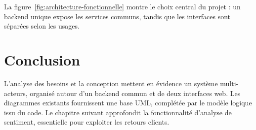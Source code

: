 La figure~\ref{fig:architecture-fonctionnelle} montre le choix central du projet : un backend unique expose les services communs, tandis que les interfaces sont séparées selon les usages.

\section*{Conclusion}
L'analyse des besoins et la conception mettent en évidence un système multi-acteurs, organisé autour d'un backend commun et de deux interfaces web. Les diagrammes existants fournissent une base UML, complétée par le modèle logique issu du code. Le chapitre suivant approfondit la fonctionnalité d'analyse de sentiment, essentielle pour exploiter les retours clients.
